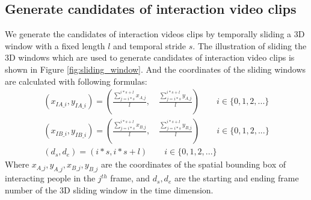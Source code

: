 \subsection{Generate candidates of interaction video clips}
\label{genIBB}
We generate the candidates of interaction videos clips by temporally sliding a 3D window with a fixed length \(l\) and temporal stride \(s\).  The illustration of sliding the 3D windows which are used to generate candidates of interaction video clips is shown in Figure \ref{fig:sliding_window}. And the coordinates of the sliding windows are calculated with following formulas:
\begin{eqnarray}
	(x_{IA\_i},y_{IA\_i}) = (\frac{\sum_{j=i*s}^{i*s+l} x_{A\_j}}{l}, \quad \frac{\sum_{j=i*s}^{i*s+l} y_{A\_j}}{l})   \quad \quad i \in \{0,1,2,...\} \\
	(x_{IB\_i},y_{IB\_i}) = (\frac{\sum_{j=i*s}^{i*s+l} x_{B\_j}}{l}, \quad \frac{\sum_{j=i*s}^{i*s+l} y_{B\_j}}{l})   \quad \quad i \in \{0,1,2,...\} \\
	(d_s,d_e) = (i*s,i*s+l)    \quad \quad i \in \{0,1,2,...\} 	
\end{eqnarray}
Where \(x_{A\_j}, y_{A\_j}, x_{B\_j}, y_{B\_j}\) are the coordinates of the spatial bounding box of interacting people in the \(j^{th}\) frame, and \(d_s,d_e\) are the starting and ending frame number of the 3D sliding window in the time dimension. 
